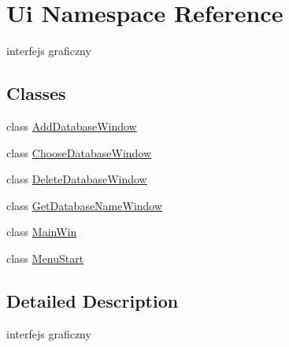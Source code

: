 \hypertarget{namespace_ui}{}\section{Ui Namespace Reference}
\label{namespace_ui}


interfejs graficzny  


\subsection*{Classes}
\begin{DoxyCompactItemize}
\item 
class \mbox{\hyperlink{class_ui_1_1_add_database_window}{Add\+Database\+Window}}
\item 
class \mbox{\hyperlink{class_ui_1_1_choose_database_window}{Choose\+Database\+Window}}
\item 
class \mbox{\hyperlink{class_ui_1_1_delete_database_window}{Delete\+Database\+Window}}
\item 
class \mbox{\hyperlink{class_ui_1_1_get_database_name_window}{Get\+Database\+Name\+Window}}
\item 
class \mbox{\hyperlink{class_ui_1_1_main_win}{Main\+Win}}
\item 
class \mbox{\hyperlink{class_ui_1_1_menu_start}{Menu\+Start}}
\end{DoxyCompactItemize}


\subsection{Detailed Description}
interfejs graficzny 